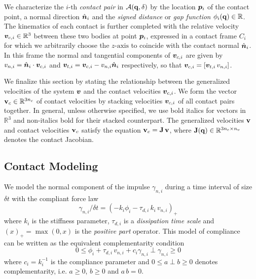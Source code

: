 We characterize the $i\text{-th}$ \emph{contact pair} in
$\mathcal{A}({\mathbf{q}},\delta)$ by the location ${\bm{p}}_i$ of the contact point, a
normal direction $\hat{{\bm{n}}}_i$ and the \emph{signed distance} or \emph{gap
function} $\phi_i({\mathbf{q}})\in\mathbb{R}$. The kinematics of each contact is
further completed with the relative velocity ${\bm{v}}_{c,i}\in\mathbb{R}^3$
between these two bodies at point ${\bm{p}}_i$, expressed in a contact frame $C_i$
for which we arbitrarily choose the $z\text{-axis}$ to coincide with the contact
normal $\hat{{\bm{n}}}_i$. In this frame the normal and tangential components of
${\bm{v}}_{c,i}$ are given by $v_{n,i} = \hat{{\bm{n}}}_i\cdot{\bm{v}}_{c,i}$ and
${\bm{v}}_{t,i} = {\bm{v}}_{c,i}-v_{n,i}\hat{{\bm{n}}}_i$ respectively, so that
${\bm{v}}_{c,i}=[{\bm{v}}_{t,i}\,v_{n,i}]$.

We finalize this section by stating the relationship between the generalized
velocities of the system ${\bm{v}}$ and the contact velocities ${\bm{v}}_{c,i}$. We
form the vector ${\mathbf{v}}_{c}\in\mathbb{R}^{3n_c}$ of contact velocities by
stacking velocities ${\bm{v}}_{c,i}$ of all contact pairs together. In general,
unless otherwise specified, we use bold italics for vectors in $\mathbb{R}^3$
and non-italics bold for their stacked counterpart. The generalized velocities
${\mathbf{v}}$ and contact velocities ${\mathbf{v}}_c$ satisfy the equation
${\mathbf{v}}_c={\mathbf{J}}\,{\mathbf{v}}$, where ${\mathbf{J}}({\mathbf{q}})\in\mathbb{R}^{3n_c\times n_v}$
denotes the contact Jacobian.

\subsection{Contact Modeling}
We model the normal component of the impulse $\gamma_{n,i}$ during a time
interval of size $\delta t$ with the compliant force law
\begin{equation}
    \gamma_{n,i}/\delta t = (-k_i\phi_i - \tau_{d,i}\,k_i\,v_{n,i})_+
    \label{eq:compliant_model}
\end{equation}
where $k_i$ is the stiffness parameter, $\tau_{d,i}$ is a \textit{dissipation time
scale} and $(x)_+=\max(0, x)$ is the \textit{positive part} operator. This model
of compliance can be written as the equivalent complementarity condition
\begin{equation}
    0 \le \phi_i + \tau_{d,i}\,v_{n,i} + c_i \gamma_{n,i}\perp \gamma_{n,i} \ge 0
\end{equation}
where $c_i=k_i^{-1}$ is the compliance parameter and $0 \le a\perp b \ge 0$ denotes
complementarity, i.e. $a \ge 0$, $b \ge 0$ and $a\,b=0$.


